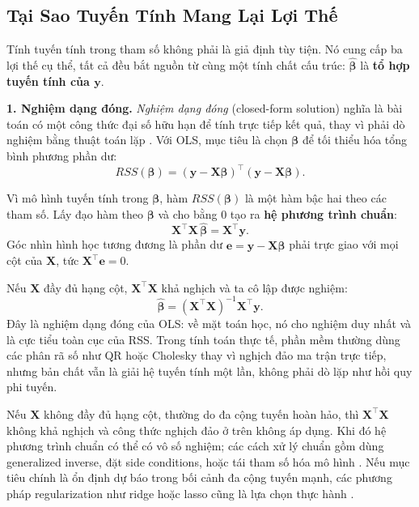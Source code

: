 \subsection{Tại Sao Tuyến Tính Mang Lại Lợi Thế}

Tính tuyến tính trong tham số không phải là giả định tùy tiện. Nó cung cấp ba lợi thế cụ thể, tất cả đều bắt nguồn từ cùng một tính chất cấu trúc: $\hat{\boldsymbol{\beta}}$ là \textbf{tổ hợp tuyến tính của $\mathbf{y}$}.

\textbf{1. Nghiệm dạng đóng.}
\textit{Nghiệm dạng đóng} (closed-form solution) nghĩa là bài toán có một công thức đại số hữu hạn để tính trực tiếp kết quả, thay vì phải dò nghiệm bằng thuật toán lặp \cite[Sec.~2.4]{weisberg2014applied}. Với OLS, mục tiêu là chọn $\boldsymbol{\beta}$ để tối thiểu hóa tổng bình phương phần dư:
\[
  RSS(\boldsymbol{\beta})
  = (\mathbf{y} - \mathbf{X}\boldsymbol{\beta})^\top
    (\mathbf{y} - \mathbf{X}\boldsymbol{\beta}).
\]

Vì mô hình tuyến tính trong $\boldsymbol{\beta}$, hàm $RSS(\boldsymbol{\beta})$ là một hàm bậc hai theo các tham số. Lấy đạo hàm theo $\boldsymbol{\beta}$ và cho bằng 0 tạo ra \textbf{hệ phương trình chuẩn}:
\[
  \mathbf{X}^\top\mathbf{X}\,\hat{\boldsymbol{\beta}}
  = \mathbf{X}^\top\mathbf{y}.
\]
Góc nhìn hình học tương đương là phần dư $\mathbf{e}=\mathbf{y}-\mathbf{X}\hat{\boldsymbol{\beta}}$ phải trực giao với mọi cột của $\mathbf{X}$, tức $\mathbf{X}^\top\mathbf{e}=0$.

Nếu $\mathbf{X}$ đầy đủ hạng cột, $\mathbf{X}^\top\mathbf{X}$ khả nghịch và ta cô lập được nghiệm:
\[
  \hat{\boldsymbol{\beta}}
  = (\mathbf{X}^\top\mathbf{X})^{-1}\mathbf{X}^\top\mathbf{y}.
\]
Đây là nghiệm dạng đóng của OLS: về mặt toán học, nó cho nghiệm duy nhất và là cực tiểu toàn cục của RSS. Trong tính toán thực tế, phần mềm thường dùng các phân rã số như QR hoặc Cholesky thay vì nghịch đảo ma trận trực tiếp, nhưng bản chất vẫn là giải hệ tuyến tính một lần, không phải dò lặp như hồi quy phi tuyến.


Nếu $\mathbf{X}$ không đầy đủ hạng cột, thường do đa cộng tuyến hoàn hảo, thì $\mathbf{X}^\top\mathbf{X}$ không khả nghịch và công thức nghịch đảo ở trên không áp dụng. Khi đó hệ phương trình chuẩn có thể có vô số nghiệm; các cách xử lý chuẩn gồm dùng generalized inverse, đặt side conditions, hoặc tái tham số hóa mô hình \cite[Ch.~12, p.~302]{rencher2008linear}. Nếu mục tiêu chính là ổn định dự báo trong bối cảnh đa cộng tuyến mạnh, các phương pháp regularization như ridge hoặc lasso cũng là lựa chọn thực hành \cite[Sec.~10.2.3, p.~244]{weisberg2014applied}.

